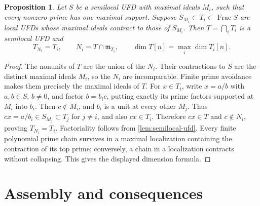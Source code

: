 \documentclass[11pt,reqno]{amsart}
\numberwithin{equation}{section}
\theoremstyle{plain}
\newtheorem{proposition}[theorem]{Proposition}
\theoremstyle{definition}
\theoremstyle{remark}
\begin{document}
\begin{proposition}\label{prop:exact-gluing}
Let \(S\) be a semilocal UFD with maximal ideals \(M_i\),
such that every nonzero prime has one maximal support. Suppose
\(S_{M_i}\subset T_i\subset\operatorname{Frac}S\) are local
UFDs whose maximal ideals contract to those of \(S_{M_i}\).
Then \(T=\bigcap_iT_i\) is a semilocal UFD and
\[
 T_{N_i}=T_i,\qquad N_i=T\cap\mathfrak m_{T_i},\qquad
 \dim T[n]=\max_i\dim T_i[n].
\]
\end{proposition}
\begin{proof}
The nonunits of \(T\) are the union of the \(N_i\).
Their contractions to \(S\) are the distinct maximal ideals
\(M_i\), so the \(N_i\) are incomparable. Finite prime
avoidance makes them precisely the maximal ideals of \(T\).
For \(x\in T_i\), write \(x=a/b\) with \(a,b\in S\),
\(b\ne0\), and factor \(b=b_i c\), putting exactly its
prime factors supported at \(M_i\) into \(b_i\). Then
\(c\notin M_i\), and \(b_i\) is a unit at every other
\(M_j\). Thus \(cx=a/b_i\in S_{M_j}\subset T_j\) for
\(j\ne i\), and also \(cx\in T_i\). Therefore \(cx\in T\)
and \(c\notin N_i\), proving \(T_{N_i}=T_i\).
Factoriality follows from \cref{lem:semilocal-ufd}.
Every finite polynomial prime chain survives in a maximal
localization containing the contraction of its top prime;
conversely, a chain in a localization contracts without
collapsing. This gives the displayed dimension formula.
\end{proof}

\section{Assembly and consequences}\label{sec:assembly}
\end{document}
